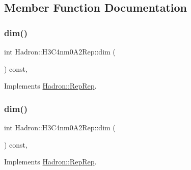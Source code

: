 \subsection{Member Function Documentation}
\mbox{\label{structHadron_1_1H3C4nm0A2Rep_a50d389ad6ec55078eb0fa7192883c1fa}} 
\subsubsection{\texorpdfstring{dim()}{dim()}\hspace{0.1cm}{\footnotesize\ttfamily [1/5]}}
{\footnotesize\ttfamily int Hadron\+::\+H3\+C4nm0\+A2\+Rep\+::dim (\begin{DoxyParamCaption}{ }\end{DoxyParamCaption}) const\hspace{0.3cm}{\ttfamily [inline]}, {\ttfamily [virtual]}}



Implements \mbox{\hyperlink{structHadron_1_1RepRep_a92c8802e5ed7afd7da43ccfd5b7cd92b}{Hadron\+::\+Rep\+Rep}}.

\mbox{\label{structHadron_1_1H3C4nm0A2Rep_a50d389ad6ec55078eb0fa7192883c1fa}} 
\subsubsection{\texorpdfstring{dim()}{dim()}\hspace{0.1cm}{\footnotesize\ttfamily [2/5]}}
{\footnotesize\ttfamily int Hadron\+::\+H3\+C4nm0\+A2\+Rep\+::dim (\begin{DoxyParamCaption}{ }\end{DoxyParamCaption}) const\hspace{0.3cm}{\ttfamily [inline]}, {\ttfamily [virtual]}}



Implements \mbox{\hyperlink{structHadron_1_1RepRep_a92c8802e5ed7afd7da43ccfd5b7cd92b}{Hadron\+::\+Rep\+Rep}}.

\mbox{\label{structHadron_1_1H3C4nm0A2Rep_a50d389ad6ec55078eb0fa7192883c1fa}} 
